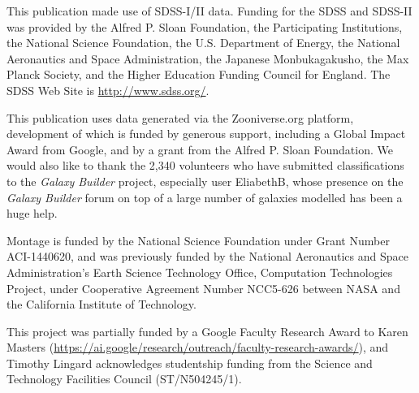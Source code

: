 \documentclass[main\.tex]{subfiles}
\begin{document}
\label{sec:acknowledgements}
This publication made use of SDSS-I/II data. Funding for the SDSS and SDSS-II was provided by the Alfred P. Sloan Foundation, the Participating Institutions, the National Science Foundation, the U.S. Department of Energy, the National Aeronautics and Space Administration, the Japanese Monbukagakusho, the Max Planck Society, and the Higher Education Funding Council for England. The SDSS Web Site is \url{http://www.sdss.org/}.

This publication uses data generated via the Zooniverse.org platform, development of which is funded by generous support, including a Global Impact Award from Google, and by a grant from the Alfred P. Sloan Foundation. We would also like to thank the 2,340 volunteers who have submitted classifications to the \textit{Galaxy Builder} project, especially user EliabethB, whose presence on the \textit{Galaxy Builder} forum on top of a large number of galaxies modelled has been a huge help.

Montage is funded by the National Science Foundation under Grant Number ACI-1440620, and was previously funded by the National Aeronautics and Space Administration's Earth Science Technology Office, Computation Technologies Project, under Cooperative Agreement Number NCC5-626 between NASA and the California Institute of Technology.

This project was partially funded by a Google Faculty Research Award to Karen Masters (\url{https://ai.google/research/outreach/faculty-research-awards/}), and Timothy Lingard acknowledges studentship funding from the Science and Technology Facilities Council (ST/N504245/1).
\end{document}
